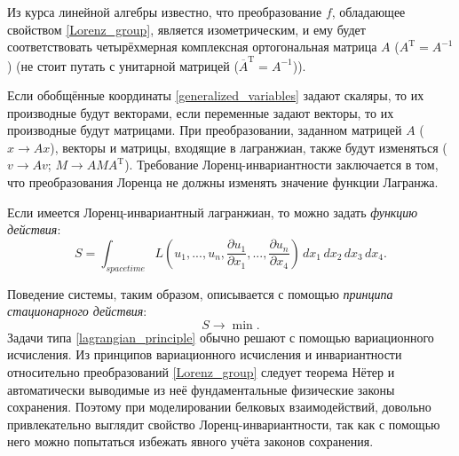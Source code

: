 Из курса линейной алгебры известно, что преобразование $f$, обладающее свойством \ref{Lorenz_group}, является изометрическим, и ему будет соответствовать
четырёхмерная комплексная ортогональная матрица $A$ ($A^\mathrm{T}=A^{-1}$) (не стоит путать с унитарной матрицей ($\overline{A}^\mathrm{T}=A^{-1}$)).

Если обобщённые координаты \ref{generalized_variables} задают скаляры, то их производные будут векторами, если переменные задают векторы, то их производные будут матрицами.
При преобразовании, заданном матрицей $A$ ($x \rightarrow Ax$), векторы и матрицы, входящие в лагранжиан, также будут изменяться
($v \rightarrow Av$; $M \rightarrow AMA^\mathrm{T}$). Требование Лоренц-инвариантности заключается в том, что преобразования Лоренца не должны изменять значение функции Лагранжа.

Если имеется Лоренц-инвариантный лагранжиан, то можно задать \textit{функцию действия}:
\begin{equation}
	S = \int_{spacetime}L(u_1, ..., u_n, \frac{\partial{u_1}}{\partial{x_1}}, ..., \frac{\partial{u_n}}{\partial{x_4}}) \, dx_1 \, dx_2 \, dx_3 \, dx_4.
	\label{action_function}
\end{equation}

Поведение системы, таким образом, описывается с помощью \textit{принципа стационарного действия}:
\begin{equation}
	S \rightarrow \min.
	\label{lagrangian_principle}
\end{equation}
Задачи типа \ref{lagrangian_principle} обычно решают с помощью вариационного исчисления. Из принципов вариационного исчисления и инвариантности относительно преобразований
\ref{Lorenz_group} следует теорема Нётер и автоматически выводимые из неё фундаментальные физические законы сохранения. Поэтому при моделировании белковых взаимодействий,
довольно привлекательно выглядит свойство Лоренц-инвариантности, так как с помощью него можно попытаться избежать явного учёта законов сохранения.

